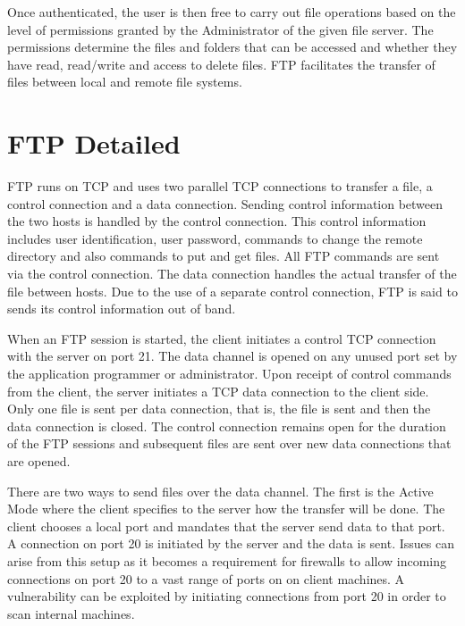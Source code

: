 Once authenticated, the user is then free to carry out file operations based on the level of permissions granted by the Administrator of the given file server.
The permissions determine the files and folders that can be accessed and whether they have read, read/write and access to delete files.
FTP facilitates the transfer of files between local and remote file systems.\newpage

\section{FTP Detailed}
FTP runs on TCP and uses two parallel TCP connections to transfer a file, a control connection and a data connection.
Sending control information between the two hosts is handled by the control connection.
This control information includes user identification, user password, commands to change the remote directory and also commands to put and get files.
All FTP commands are sent via the control connection. The data connection handles the actual transfer of the file between hosts.
Due to the use of a separate control connection, FTP is said to sends its control information out of band. \par

When an FTP session is started, the client initiates a control TCP connection with the server on port 21.
The data channel is opened on any unused port set by the application programmer or administrator. Upon receipt of control commands from the client,
the server initiates a TCP data connection to the client side. Only one file is sent per data connection, that is, the file is sent and then the data connection is closed.
The control connection remains open for the duration of the FTP sessions and subsequent files are sent over new data connections that are opened.\par

There are two ways to send files over the data channel. The first is the Active Mode where the client specifies to the server how the transfer will be done. The client chooses a local port
and mandates that the server send data to that port. A connection on port 20 is initiated by the server and the data is sent. Issues can arise from this setup as it becomes a requirement
for firewalls to allow incoming connections on port 20 to a vast range of ports on on client machines. A vulnerability can be exploited by initiating connections from port 20 in order to
scan internal machines. \par


